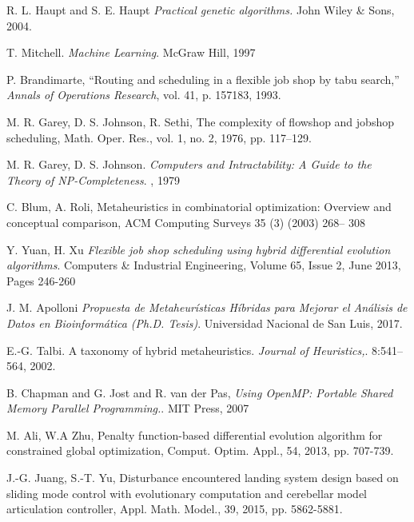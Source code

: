 

\begin{thebibliography}{9}
    R. L. Haupt and S. E. Haupt
    \textit{Practical genetic algorithms.} 
    John Wiley \& Sons, 2004.

    T. Mitchell.
    \textit{Machine Learning}. 
    McGraw Hill, 1997
    
    P. Brandimarte, “Routing and scheduling in a flexible job shop by tabu search,”
    \textit{Annals of Operations Research}, 
    vol. 41, p. 157183, 1993.

    M. R. Garey, D. S. Johnson, R. Sethi, The complexity of flowshop and jobshop scheduling, Math. Oper. Res., vol. 1, no. 2, 1976, pp. 117–129.
    
    M. R. Garey, D. S. Johnson.
    \textit{Computers and Intractability: A Guide to the Theory of NP-Completeness}. 
    , 1979
    
    C. Blum, A. Roli, Metaheuristics in combinatorial optimization: Overview
    and conceptual comparison, ACM Computing Surveys 35 (3) (2003) 268–
    308
    
    Y. Yuan, H. Xu
    \textit{Flexible job shop scheduling using hybrid differential evolution algorithms}. 
    Computers \& Industrial Engineering, Volume 65, Issue 2, June 2013, Pages 246-260

    J. M. Apolloni
    \textit{Propuesta de Metaheurísticas Híbridas para Mejorar el Análisis de Datos en Bioinformática (Ph.D. Tesis)}.
    Universidad Nacional de San Luis, 2017.
    
    E.-G. Talbi. A taxonomy of hybrid metaheuristics.
    \textit{Journal of Heuristics,}.
    8:541–564, 2002.
    
    B. Chapman and G. Jost and R. van der Pas, 
    \textit{Using OpenMP: Portable Shared Memory Parallel Programming.}.
    MIT Press, 2007
    
    M. Ali, W.A Zhu, Penalty function-based differential evolution algorithm for constrained global optimization, Comput. Optim. Appl., 54, 2013, pp. 707-739.
     
    J.-G. Juang, S.-T. Yu, Disturbance encountered landing system design based on sliding mode control with evolutionary computation and cerebellar model articulation controller, Appl. Math. Model., 39, 2015, pp. 5862-5881.
     

\end{thebibliography}
